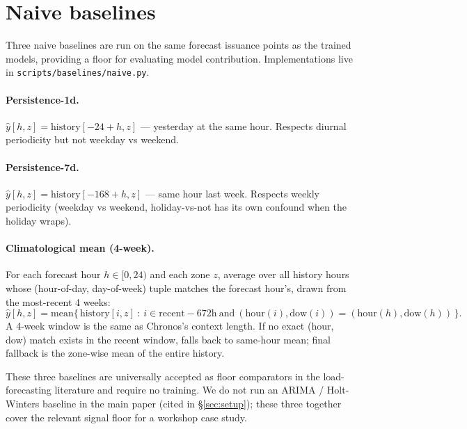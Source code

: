 
\section{Naive baselines}
\label{app:baselines}

Three naive baselines are run on the same forecast issuance points as
the trained models, providing a floor for evaluating model
contribution. Implementations live in
\texttt{scripts/baselines/naive.py}.

\paragraph{Persistence-1d.}
$\hat y[h, z] = \mathrm{history}[-24 + h, z]$ — yesterday at the same
hour. Respects diurnal periodicity but not weekday vs weekend.

\paragraph{Persistence-7d.}
$\hat y[h, z] = \mathrm{history}[-168 + h, z]$ — same hour last week.
Respects weekly periodicity (weekday vs weekend, holiday-vs-not has its
own confound when the holiday wraps).

\paragraph{Climatological mean (4-week).}
For each forecast hour $h \in [0, 24)$ and each zone $z$, average over
all history hours whose (hour-of-day, day-of-week) tuple matches the
forecast hour's, drawn from the most-recent 4 weeks:
\begin{equation}
\hat y[h, z] = \mathrm{mean}\bigl\{\,
\mathrm{history}[i, z]\ :\
i \in \mathrm{recent-672h}\
\text{and}\
(\mathrm{hour}(i), \mathrm{dow}(i)) = (\mathrm{hour}(h), \mathrm{dow}(h))
\,\bigr\}.
\end{equation}
A 4-week window is the same as Chronos's context length. If no exact
(hour, dow) match exists in the recent window, falls back to same-hour
mean; final fallback is the zone-wise mean of the entire history.

These three baselines are universally accepted as floor comparators in
the load-forecasting literature \citep{hong2016probabilistic,
hippert2001neural} and require no training. We do not run an ARIMA /
Holt-Winters baseline in the main paper (cited in
\S\ref{sec:setup}); these three together cover the relevant signal
floor for a workshop case study.

